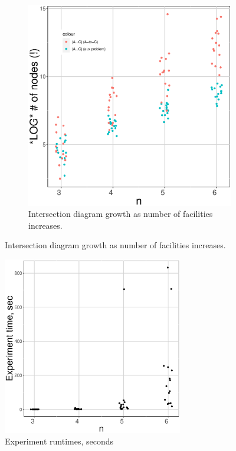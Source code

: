 \documentclass[11pt]{article}
\begin{document}
\begin{figure}
\begin{subfigure}{0.45\textwidth}
    \includegraphics[width=\textwidth]{inter_size.eps}
    \caption{Intersection diagram growth as number of facilities increases.}
    \label{fig:intSizes}
  \end{subfigure}
\end{figure}

\begin{figure}
\center
\includegraphics[width=0.7\textwidth]{runtimes.eps}
\caption{Experiment runtimes, seconds}
\label{fig:runtimes}
\end{figure}
\end{document}
